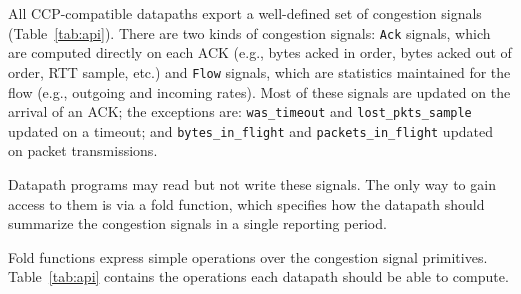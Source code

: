  

 All CCP-compatible datapaths export a well-defined set of congestion signals (Table~\ref{tab:api}). There are two kinds of congestion signals: \texttt{Ack} signals, which are computed directly on each ACK (e.g., bytes acked in order, bytes acked out of order, RTT sample, etc.) and \texttt{Flow} signals, which are statistics maintained for the flow (e.g., outgoing and incoming rates). Most of these signals are updated on the arrival of an ACK; the exceptions are: \texttt{was\_timeout} and \texttt{lost\_pkts\_sample} updated on a timeout; and \texttt{bytes\_in\_flight} and \texttt{packets\_in\_flight} updated on packet transmissions.
 

Datapath programs may read but not write these signals. The only way to gain access to them is via a fold function, which specifies how the datapath should summarize the congestion signals in a single reporting period. 
 
 
%

Fold functions express simple operations over the congestion signal primitives. Table~\ref{tab:api} contains the operations each datapath should be able to compute. 

 
